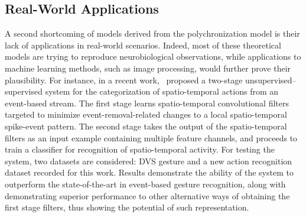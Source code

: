 \documentclass[brainsci, %
               review,accept,pdftex,moreauthors
               ]{Definitions/mdpi}
\begin{document}







\subsection{Real-World Applications}

% 

A second shortcoming of models derived from the polychronization model is their lack of applications in real-world scenarios. Indeed, most of these theoretical models are trying to reproduce neurobiological observations, while applications to machine learning methods, such as image processing, would further prove their plausibility. For instance, in a recent work,~\citet{ghosh_spatiotemporal_2019} proposed a two-stage unsupervised--supervised system for the categorization of spatio-temporal actions from an event-based stream. The first stage learns spatio-temporal convolutional filters targeted to minimize event-removal-related changes to a local spatio-temporal spike-event pattern. The second stage takes the output of the spatio-temporal filters as an input example containing multiple feature channels, and proceeds to train a classifier for recognition of spatio-temporal activity. For testing the system, two datasets are considered: DVS gesture and a new action recognition dataset recorded for this work. Results demonstrate the ability of the system to outperform the state-of-the-art in event-based gesture recognition, along with demonstrating superior performance to other alternative ways of obtaining the first stage filters, thus showing the potential of such representation. 
\end{document}
